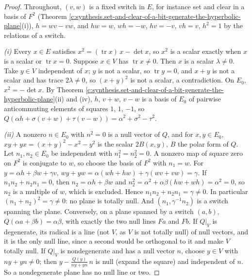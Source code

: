 \documentclass[11pt]{article}
\theoremstyle{definition}
\theoremstyle{plain}
\begin{document}
\begin{proof}
Throughout, $(v, w)$ is a fixed switch in $E$, for instance set and clear in a basis of $F^{2}$ (Theorem \ref{c:synthesis.set-and-clear-of-a-bit-generate-the-hyperbolic-plane}(i)), $h = wv - vw$, and $hw = w$, $wh = -w$, $hv = -v$, $vh = v$, $h^{2} = 1$ by the relations of a switch.

\emph{(i)} Every $x \in E$ satisfies $x^{2} = (\operatorname{tr}x)\,x - \det x$, so $x^{2}$ is a scalar exactly when $x$ is a scalar or $\operatorname{tr}x = 0$. Suppose $x \in V$ has $\operatorname{tr}x \ne 0$. Then $x$ is a scalar $\lambda \ne 0$. Take $y \in V$ independent of $x$; $y$ is not a scalar, so $\operatorname{tr}y = 0$, and $x + y$ is not a scalar and has trace $2\lambda \ne 0$, so $(x + y)^{2}$ is not a scalar, a contradiction. On $E_{0}$, $x^{2} = -\det x$. By Theorem \ref{c:synthesis.set-and-clear-of-a-bit-generate-the-hyperbolic-plane}(ii) and (iv), $h$, $v + w$, $v - w$ is a basis of $E_{0}$ of pairwise anticommuting elements of squares $1$, $1$, $-1$, so $Q(\alpha h + \sigma(v + w) + \tau(v - w)) = \alpha^{2} + \sigma^{2} - \tau^{2}$.

\emph{(ii)} A nonzero $n \in E_{0}$ with $n^{2} = 0$ is a null vector of $Q$, and for $x, y \in E_{0}$, $xy + yx = (x + y)^{2} - x^{2} - y^{2}$ is the scalar $2B(x,y)$, $B$ the polar form of $Q$. Let $n_{1}, n_{2} \in E_{0}$ be independent with $n_{1}^{2} = n_{2}^{2} = 0$. A nonzero map of square zero on $F^{2}$ is conjugate to $w$, so choose the basis of $F^{2}$ with $n_{1} = w$. For $y = \alpha h + \beta w + \gamma v$, $wy + yw = \alpha(wh + hw) + \gamma(wv + vw) = \gamma$. If $n_{1}n_{2} + n_{2}n_{1} = 0$, then $n_{2} = \alpha h + \beta w$ and $n_{2}^{2} = \alpha^{2} + \alpha\beta(hw + wh) = \alpha^{2} = 0$, so $n_{2}$ is a multiple of $w$, which is excluded. Hence $n_{1}n_{2} + n_{2}n_{1} = \gamma \ne 0$. In particular $(n_{1} + n_{2})^{2} = \gamma \ne 0$: no plane is totally null. And $(n_{1}, \gamma^{-1}n_{2})$ is a switch spanning the plane. Conversely, on a plane spanned by a switch $(a, b)$, $Q(\alpha a + \beta b) = \alpha\beta$, with exactly the two null lines $Fa$ and $Fb$. If $Q|_{V}$ is degenerate, its radical is a line (not $V$, as $V$ is not totally null) of null vectors, and it is the only null line, since a second would be orthogonal to it and make $V$ totally null. If $Q|_{V}$ is nondegenerate and has a null vector $n$, choose $y \in V$ with $ny + yn \ne 0$; then $y - \frac{Q(y)}{ny + yn}\,n$ is null (expand the square) and independent of $n$. So a nondegenerate plane has no null line or two.


\end{proof}
\end{document}
